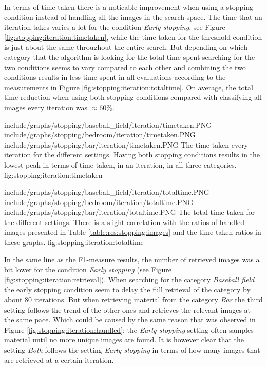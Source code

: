 In terms of time taken there is a noticable improvement when using a stopping condition instead of handling all the images in the search space. The time that an iteration takes varies a lot for the condition \emph{Early stopping}, see Figure \ref{fig:stopping:iteration:timetaken}, while the time taken for the threshold condition is just about the same throughout the entire search. But depending on which category that the algorithm is looking for the total time spent searching for the two conditions seems to vary compared to each other and combining the two conditions results in less time spent in all evaluations according to the measurements in Figure \ref{fig:stopping:iteration:totaltime}. On average, the total time reduction when using both stopping conditions compared with classifying all images every iteration was $\approx60\%$. 

\tripfigurenear
{include/graphs/stopping/baseball_field/iteration/timetaken.PNG}
{include/graphs/stopping/bedroom/iteration/timetaken.PNG}
{include/graphs/stopping/bar/iteration/timetaken.PNG}
{The time taken every iteration for the different settings. Having both stopping conditions results in the lowest peak in terms of time taken, in an iteration, in all three categories.}
{fig:stopping:iteration:timetaken}

\tripfigurenear
{include/graphs/stopping/baseball_field/iteration/totaltime.PNG}
{include/graphs/stopping/bedroom/iteration/totaltime.PNG}
{include/graphs/stopping/bar/iteration/totaltime.PNG}
{The total time taken for the different settings. There is a slight correlation with the ratios of handled images presented in Table \ref{table:res:stopping:images} and the time taken ratios in these graphs.}
{fig:stopping:iteration:totaltime}

In the same line as the F1-measure results, the number of retrieved images was a bit lower for the condition \emph{Early stopping} (see Figure \ref{fig:stopping:iteration:retrieval}). 
When searching for the category \emph{Baseball field} the early stopping condition seem to delay the full retrieval of the category by about 80 iterations. But when retrieving material from the category \emph{Bar} the third setting follows the trend of the other ones and retrieves the relevant images at the same pace. Which could be caused by the same reason that was observed in Figure \ref{fig:stopping:iteration:handled}; the \emph{Early stopping} setting often samples material until no more unique images are found. It is however clear that the setting \emph{Both} follows the setting \emph{Early stopping} in terms of how many images that are retrieved at a certain iteration. 


